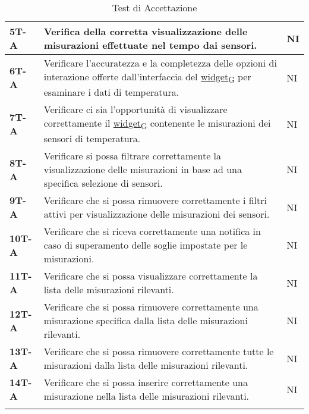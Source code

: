 \begin{longtable}{|>{\raggedright\arraybackslash}m{}|>{\raggedright\arraybackslash}m{}|>{\raggedright\arraybackslash}m{}|}
	\hline
	\textbf{5T-A}   & Verifica della corretta visualizzazione delle misurazioni effettuate nel tempo dai sensori.                                                                           & NI             \\
	\hline
	\textbf{6T-A}   & Verificare l’accuratezza e la completezza delle opzioni di interazione offerte dall’interfaccia del \href{https://7last.github.io/docs/rtb/documentazione-interna/glossario\#widget}{widget\textsubscript{G}} per esaminare i dati di temperatura.                       & NI             \\
	\hline
	\textbf{7T-A}   & Verificare ci sia l’opportunità di visualizzare correttamente il \href{https://7last.github.io/docs/rtb/documentazione-interna/glossario\#widget}{widget\textsubscript{G}} contenente le misurazioni dei sensori di temperatura.                                         & NI             \\
	\hline
	\textbf{8T-A}   & Verificare si possa filtrare correttamente la visualizzazione delle misurazioni in base ad una specifica selezione di sensori.                                        & NI             \\
	\hline
	\textbf{9T-A}   & Verificare che si possa rimuovere correttamente i filtri attivi per visualizzazione delle misurazioni dei sensori.                                                    & NI             \\
	\hline
	\textbf{10T-A}  & Verificare che si riceva correttamente una notifica in caso di superamento delle soglie impostate per le misurazioni.                                                 & NI             \\
	\hline
	\textbf{11T-A}  & Verificare che si possa visualizzare correttamente la lista delle misurazioni rilevanti.                                                                              & NI             \\
	\hline
	\textbf{12T-A}  & Verificare che si possa rimuovere correttamente una misurazione specifica dalla lista delle misurazioni rilevanti.                                                    & NI             \\
	\hline
	\textbf{13T-A}  & Verificare che si possa rimuovere correttamente tutte le misurazioni dalla lista delle misurazioni rilevanti.                                                         & NI             \\
	\hline
	\textbf{14T-A}  & Verificare che si possa inserire correttamente una misurazione nella lista delle misurazioni rilevanti.                                                               & NI             \\
	\hline
	\caption{Test di Accettazione}
\end{longtable}
